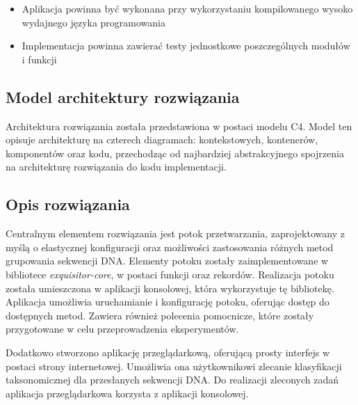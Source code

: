             \begin{itemize}
                \item Aplikacja powinna być wykonana przy wykorzystaniu kompilowanego wysoko wydajnego języka programowania
                \item Implementacja powinna zawierać testy jednostkowe poszczególnych modułów i funkcji
            \end{itemize}

    \subsection{Model architektury rozwiązania}

        Architektura rozwiązania została przedstawiona w postaci modelu C4\cite{C4}. Model ten opisuje architekturę na czterech diagramach: kontekstowych, kontenerów, komponentów oraz kodu, przechodząc od najbardziej abstrakcyjnego spojrzenia na architekturę rozwiązania do kodu implementacji.
            

    \subsection{Opis rozwiązania}

        Centralnym elementem rozwiązania jest potok przetwarzania, zaprojektowany z myślą o elastycznej konfiguracji oraz możliwości zastosowania różnych metod grupowania sekwencji DNA. Elementy potoku zostały zaimplementowane w bibliotece \textit{exquisitor-core}, w postaci funkcji oraz rekordów. Realizacja potoku została umieszczona w aplikacji konsolowej, która wykorzystuje tę bibliotekę. Aplikacja umożliwia uruchamianie i konfigurację potoku, oferując dostęp do dostępnych metod. Zawiera również polecenia pomocnicze, które zostały przygotowane w celu przeprowadzenia eksperymentów.

        Dodatkowo stworzono aplikację przeglądarkową, oferującą prosty interfejs w postaci strony internetowej. Umożliwia ona użytkownikowi zlecanie klasyfikacji taksonomicznej dla przesłanych sekwencji DNA. Do realizacji zleconych zadań aplikacja przeglądarkowa korzysta z aplikacji konsolowej.

